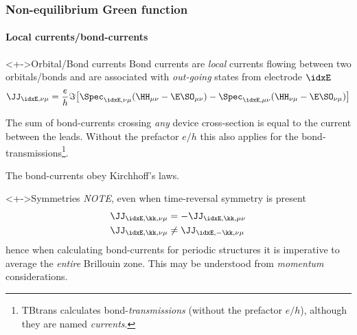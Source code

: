 \begin{frame}
  \frametitle{Non-equilibrium Green function}
  \framesubtitle{Local currents/bond-currents}

  \begin{block}<+->{Orbital/Bond currents}
    Bond currents are \emph{local} currents flowing between two orbitals/bonds and are
    associated with \emph{out-going} states from electrode $\idxE$
    \begin{equation*}
      \JJ_{\idxE,\nu\mu} = \frac e h \Im\big[
      \Spec_{\idxE,\nu\mu}(\HH_{\mu\nu} - \E\SO_{\mu\nu})
      -
      \Spec_{\idxE,\mu\nu}(\HH_{\nu\mu} - \E\SO_{\nu\mu})\big]
    \end{equation*}

    The sum of bond-currents crossing \emph{any} device cross-section is equal to the
    current between the leads. Without the prefactor $e/h$ this also applies for the
    bond-transmissions\footnote{TBtrans calculates bond-\emph{transmissions} (without the
        prefactor $e/h$), although they are named \emph{currents}.}.

    The bond-currents obey Kirchhoff's laws.

  \end{block}

  \begin{block}<+->{Symmetries}
    \emph{NOTE}, even when time-reversal symmetry is present
    \begin{align*}
      \JJ_{\idxE,\kk,\nu\mu} &= - \JJ_{\idxE,\kk,\mu\nu}
      \\
      \JJ_{\idxE,\kk,\nu\mu} &\neq \JJ_{\idxE,-\kk,\nu\mu}
    \end{align*}
    hence when calculating bond-currents for periodic structures it is imperative to
    average the \emph{entire} Brillouin zone. This may be understood from \emph{momentum}
    considerations.
  \end{block}

\end{frame}


